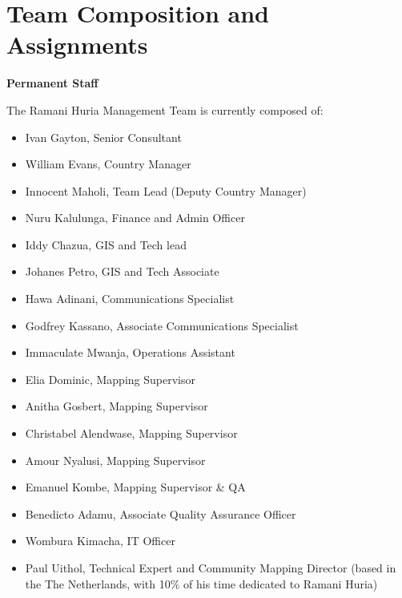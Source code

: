 \documentclass[a4paper,12pt,twoside]{article}
\begin{document}
\newpage
\section{Team Composition and Assignments}

\textbf{Permanent Staff}

The Ramani Huria Management Team is currently composed of:
\begin{itemize}
     
 \item Ivan Gayton, Senior Consultant
 \item William Evans, Country Manager
 \item Innocent Maholi, Team Lead (Deputy Country Manager)
 \item Nuru Kalulunga, Finance and Admin Officer
 \item Iddy Chazua, GIS and Tech lead
 \item Johanes Petro, GIS and Tech Associate
 \item Hawa Adinani, Communications Specialist
 \item Godfrey Kassano, Associate Communications Specialist
 \item Immaculate Mwanja, Operations Assistant
 \item Elia Dominic, Mapping Supervisor
 \item Anitha Gosbert, Mapping Supervisor
 \item Christabel Alendwase, Mapping Supervisor
 \item Amour Nyalusi, Mapping Supervisor
 \item Emanuel Kombe, Mapping Supervisor & QA
 \item Benedicto Adamu, Associate Quality Assurance Officer
 \item Wombura Kimacha, IT Officer
 \item Paul Uithol, Technical Expert and Community Mapping Director (based in the
The Netherlands, with 10\% of his time dedicated to Ramani Huria)
\end{itemize}

\newpage
\end{document}
